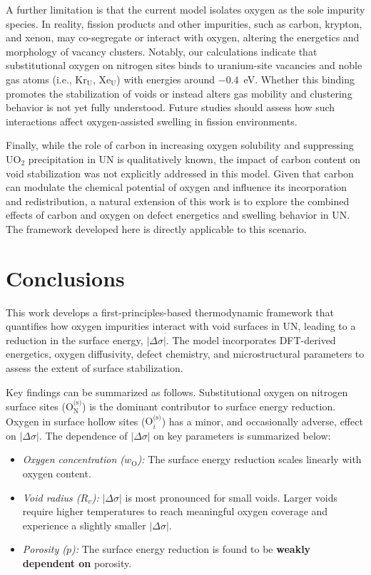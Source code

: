 \documentclass[preprint,12pt,sort&compress]{elsarticle}
\newcommand{\?}{\stackrel{?}{=}}
\providecommand{\DIFaddtex}[1]{{\bf #1}} %
\providecommand{\DIFdeltex}[1]{} %
\providecommand{\DIFaddbegin}{\protect\color{blue}} %
\providecommand{\DIFaddend}{\protect\color{black}} %
\providecommand{\DIFdelbegin}{\protect\color{red}} %
\providecommand{\DIFdelend}{\protect\color{black}} %
\providecommand{\DIFadd}[1]{\texorpdfstring{\DIFaddtex{#1}}{#1}} %
\providecommand{\DIFdel}[1]{\texorpdfstring{\DIFdeltex{#1}}{}} %
\newcommand{\DIFscaledelfig}{0.5}
\newlength{\DIFdelgraphicswidth} %
\newlength{\DIFdelgraphicsheight} %
\newcommand{\DIFaddincludegraphics}[2][]{{\color{blue}\fbox{\DIFOincludegraphics[#1]{#2}}}} %
\newcommand{\DIFdelincludegraphics}[2][]{%
\sbox{\DIFdelgraphicsbox}{\DIFOincludegraphics[#1]{#2}}%
\settoboxwidth{\DIFdelgraphicswidth}{\DIFdelgraphicsbox} %
\settoboxtotalheight{\DIFdelgraphicsheight}{\DIFdelgraphicsbox} %
\scalebox{\DIFscaledelfig}{%
\parbox[b]{\DIFdelgraphicswidth}{\usebox{\DIFdelgraphicsbox}\\[-\baselineskip] \rule{\DIFdelgraphicswidth}{0em}}\llap{\resizebox{\DIFdelgraphicswidth}{\DIFdelgraphicsheight}{%
\setlength{\unitlength}{\DIFdelgraphicswidth}%
\begin{picture}(1,1)%
\thicklines\linethickness{2pt} %
{\color[rgb]{1,0,0}\put(0,0){\framebox(1,1){}}}%
{\color[rgb]{1,0,0}\put(0,0){\line( 1,1){1}}}%
{\color[rgb]{1,0,0}\put(0,1){\line(1,-1){1}}}%
\end{picture}%
}\hspace*{3pt}}} %
} %
\DeclareRobustCommand{\DIFaddbegin}{\DIFOaddbegin \let\includegraphics\DIFaddincludegraphics} %
\DeclareRobustCommand{\DIFaddend}{\DIFOaddend \let\includegraphics\DIFOincludegraphics} %
\DeclareRobustCommand{\DIFdelbegin}{\DIFOdelbegin \let\includegraphics\DIFdelincludegraphics} %
\DeclareRobustCommand{\DIFdelend}{\DIFOaddend \let\includegraphics\DIFOincludegraphics} %
\begin{document}
\DIFaddend A further limitation is that the current model isolates oxygen as the sole impurity species. In reality, fission products and other impurities, such as carbon, krypton, and xenon, may co-segregate or interact with oxygen, altering the energetics and morphology of vacancy clusters. Notably, our calculations indicate that substitutional oxygen on nitrogen sites binds to uranium-site vacancies and noble gas atoms (i.e., Kr$_\text{U}$, Xe$_\text{U}$) with energies around $-0.4$~eV. Whether this binding promotes the stabilization of voids or instead alters gas mobility and clustering behavior is not yet fully understood. Future studies should assess how such interactions affect oxygen-assisted swelling in fission environments.

Finally, while the role of carbon in increasing oxygen solubility and suppressing UO$_2$ precipitation in UN is qualitatively known, the impact of carbon content on void stabilization was not explicitly addressed in this model. Given that carbon can modulate the chemical potential of oxygen and influence its incorporation and redistribution, a natural extension of this work is to explore the combined effects of carbon and oxygen on defect energetics and swelling behavior in UN. The framework developed here is directly applicable to this scenario.

\section{Conclusions}

This work develops a first-principles-based thermodynamic framework that quantifies how oxygen impurities interact with void surfaces in UN, leading to a reduction in the surface energy, $|\Delta \sigma|$. The model incorporates DFT-derived energetics, oxygen diffusivity, defect chemistry, and microstructural parameters to assess the extent of surface stabilization.

Key findings can be summarized as follows. Substitutional oxygen on nitrogen surface sites ($\text{O}_\text{N}^\text{(s)}$) is the dominant contributor to surface energy reduction. Oxygen in surface hollow sites ($\text{O}_i^\text{(s)}$) has a minor, and occasionally adverse, effect on $|\Delta \sigma|$. The dependence of $|\Delta \sigma|$ on key parameters is summarized below:
\begin{itemize}
    \item \textit{Oxygen concentration ($w_\text{O}$):} The surface energy reduction scales linearly with oxygen content.
    \item \textit{Void radius ($R_v$):} $|\Delta \sigma|$ is most pronounced for small voids. Larger voids require higher temperatures to reach meaningful oxygen coverage and experience a slightly smaller $|\Delta \sigma|$.
    \item \textit{Porosity ($p$):} The surface energy reduction is found to be \DIFdelbegin \DIFdel{largely insensitive to }\DIFdelend \DIFaddbegin \DIFadd{weakly dependent on }\DIFaddend porosity.
    \end{itemize}
\end{document}
